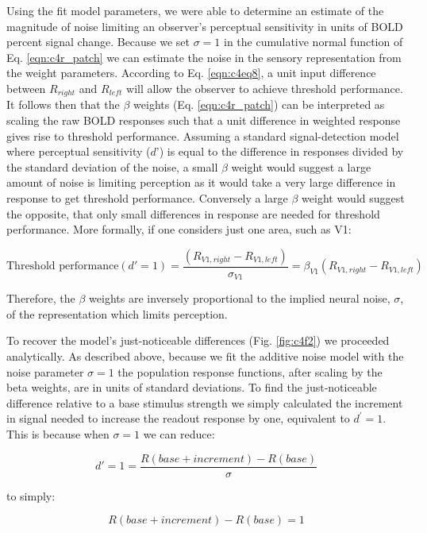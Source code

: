 \documentclass{report}
\begin{document}
Using the fit model parameters, we were able to determine an estimate of the magnitude of noise limiting an observer’s perceptual sensitivity in units of BOLD percent signal change. Because we set $\sigma=1$ in the cumulative normal function of Eq. \ref{eqn:c4r_patch} we can estimate the noise in the sensory representation from the weight parameters. According to Eq. \ref{eqn:c4eq8}, a unit input difference between $R_{right}$ and $R_{left}$ will allow the observer to achieve threshold performance. It follows then that the $\beta$ weights (Eq. \ref{eqn:c4r_patch}) can be interpreted as scaling the raw BOLD responses such that a unit difference in weighted response gives rise to threshold performance. Assuming a standard signal-detection model where perceptual sensitivity ($d’$) is equal to the difference in responses divided by the standard deviation of the noise, a small $\beta$ weight would suggest a large amount of noise is limiting perception as it would take a very large difference in response to get threshold performance. Conversely a large $\beta$ weight would suggest the opposite, that only small differences in response are needed for threshold performance. More formally, if one considers just one area, such as V1: 

\begin{equation}
    \text{Threshold performance} (d'=1) = \frac{(R_{V1,right}-R_{V1,left})}{\sigma_{V1}} = \beta_{V1}(R_{V1,right}-R_{V1,left})
\end{equation}

Therefore, the $\beta$ weights are inversely proportional to the implied neural noise, $\sigma$, of the representation which limits perception.

To recover the model's just-noticeable differences (Fig. \ref{fig:c4f2}) we proceeded analytically. As described above, because we fit the additive noise model with the noise parameter $\sigma=1$ the population response functions, after scaling by the beta weights, are in units of standard deviations. To find the just-noticeable difference relative to a base stimulus strength we simply calculated the increment in signal needed to increase the readout response by one, equivalent to $d^'=1$. This is because when $\sigma=1$ we can reduce:

\begin{equation}
    d' = 1 = \frac{R(base+increment)-R(base)}{\sigma}
\end{equation}

to simply:
 
\begin{equation}
    R(base+increment)-R(base)=1
\end{equation}
\end{document}
